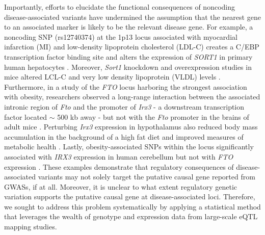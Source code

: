 \documentclass[10pt]{article}
\begin{document}
Importantly, efforts to elucidate the functional consequences of noncoding disease-associated variants have undermined the assumption that the nearest gene to an associated marker is likely to be the relevant disease gene. For example, a noncoding SNP (rs12740374) at the 1p13 locus associated with myocardial infarction (MI) and low-density lipoprotein cholesterol (LDL-C) creates a C/EBP transcription factor binding site and alters the expression of \textit{SORT1} in primary human hepatocytes \cite{Musunuru2010}. Moreover, \textit{Sort1} knockdown and overexpression studies in mice altered LCL-C and very low density lipoprotein (VLDL) levels \cite{Musunuru2010}. Furthermore, in a study of the \textit{FTO} locus harboring the strongest association with obesity, researchers observed a long-range interaction between the associated intronic region of \textit{Fto} and the promoter of \textit{Irx3} - a downstream transcription factor located  $\sim$ 500 kb away - but not with the \textit{Fto} promoter in the brains of adult mice \cite{Smemo2014a}. Perturbing \textit{Irx3} expression in hypothalamus also reduced body mass accumulation in the background of a high fat diet and improved measures of metabolic health \cite{Smemo2014a}. Lastly, obesity-associated SNPs within the locus significantly associated with \textit{IRX3} expression in human cerebellum but not with \textit{FTO} expression \cite{Smemo2014a}. These examples demonstrate that regulatory consequences of disease-associated variants may not solely target the putative causal gene reported from GWASs, if at all. Moreover, it is unclear to what extent regulatory genetic variation supports the putative causal gene at disease-associated loci. Therefore, we sought to address this problem systematically by applying a statistical method that leverages the wealth of genotype and expression data from large-scale eQTL mapping studies. 
\end{document}
